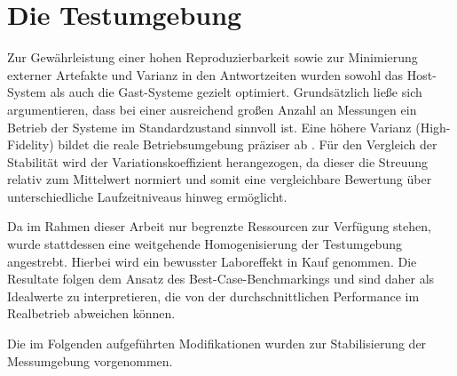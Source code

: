 \begin{sloppypar}
\section{Die Testumgebung}
Zur Gewährleistung einer hohen Reproduzierbarkeit sowie zur Minimierung externer Artefakte und Varianz in den Antwortzeiten wurden 
sowohl das Host-System als auch die Gast-Systeme gezielt optimiert. 
Grundsätzlich ließe sich argumentieren, dass bei einer ausreichend großen Anzahl an Messungen ein Betrieb der Systeme 
im Standardzustand sinnvoll ist. Eine höhere Varianz (High-Fidelity) 
bildet die reale Betriebsumgebung präziser ab \cite[S.~647]{Gregg:2020}.
Für den Vergleich der Stabilität wird der Variationskoeffizient herangezogen, 
da dieser die Streuung relativ zum Mittelwert normiert 
und somit eine vergleichbare Bewertung über unterschiedliche Laufzeitniveaus hinweg ermöglicht.

\vspace{7.56mm}

\noindent Da im Rahmen dieser Arbeit nur begrenzte Ressourcen zur Verfügung stehen, 
wurde stattdessen eine weitgehende Homogenisierung der Testumgebung angestrebt. 
Hierbei wird ein bewusster Laboreffekt in Kauf genommen. 
Die Resultate folgen dem Ansatz des Best-Case-Benchmarkings und sind daher als Idealwerte zu interpretieren, 
die von der durchschnittlichen Performance im Realbetrieb abweichen können.

\vspace{7.56mm}

\noindent Die im Folgenden aufgeführten Modifikationen wurden zur Stabilisierung der Messumgebung vorgenommen.


\end{sloppypar}
